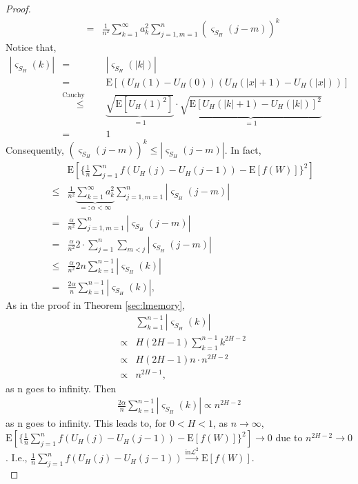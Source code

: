 \documentclass[a4paper, twoside, 11pt]{article}
\theoremstyle{definition}
\begin{document}
\begin{proof}
\begin{eqnarray*}
	&=& \frac{1}{n^2} \sum\limits_{k=1}^\infty a_k^2\sum\limits_{j=1, m=1}^n (\varsigma_{S_H}(j-m))^k
  \end{eqnarray*}
	Notice that,
	\begin{eqnarray*}
	  |\varsigma_{S_H}(k)| &=& |\varsigma_{S_H}(|k|)|\\
	  &=& \mathrm{E}[(U_H(1) - U_H(0))(U_H(|x|+1)-U_H(|x|))]\\
	  &\overset{\text{Cauchy Schwartz}}{\le}& \underbrace{\sqrt{\mathrm{E}[U_H(1)^2]}}_{= 1}\cdot \underbrace{\sqrt{\mathrm{E}[U_H(|k|+1) - U_H(|k|)]^2}}_{= 1}\\
	  &=& 1
	\end{eqnarray*}
	Consequently, $(\varsigma_{S_H}(j-m))^k \le |\varsigma_{S_H}(j-m)|$. In fact,
	\begin{eqnarray*}
	  && \mathrm{E}[\{\frac{1}{n}\sum\limits_{j=1}^n f(U_H(j) - U_H(j-1)) - \mathrm{E}[f(W)]\}^2]\\
	  &\le& \frac{1}{n^2} \underbrace{\sum\limits_{k=1}^\infty a_k^2}_{=:\alpha < \infty}\sum\limits_{j=1, m=1}^n |\varsigma_{S_H}(j-m)|\\
	  &=& \frac{\alpha}{n^2} \sum\limits_{j=1, m=1}^n |\varsigma_{S_H}(j-m)|\\
	  &=& \frac{\alpha}{n^2} 2 \cdot \sum\limits_{j=1}^n  \sum\limits_{m<j} |\varsigma_{S_H}(j-m)|\\
	  &\le& \frac{\alpha}{n^2} 2n \sum\limits_{k=1}^{n-1} |\varsigma_{S_H}(k)|\\
	  &=& \frac{2\alpha}{n}  \sum\limits_{k=1}^{n-1} |\varsigma_{S_H}(k)|,
	\end{eqnarray*}
	As in the proof in Theorem \ref{sec:lmemory}, 
	\begin{eqnarray*}
	&&\sum\limits_{k=1}^{n-1} |\varsigma_{S_H}(k)| \\
	&\propto& H(2H-1)\sum\limits_{k=1}^{n-1}k^{2H-2} \\
	&\propto& H(2H-1)n\cdot n^{2H-2} \\
	&\propto& n^{2H-1}, 
  \end{eqnarray*}
  as n goes to infinity. Then
	\begin{eqnarray*}
	  \frac{2\alpha}{n} \sum\limits_{k=1}^{n-1} |\varsigma_{S_H}(k)| \propto n^{2H-2}
	\end{eqnarray*}
	as n goes to infinity. This leads to,  for $0<H<1$, as $n \rightarrow \infty$,  $\mathrm{E}[\{\frac{1}{n}\sum\limits_{j=1}^n f(U_H(j) - U_H(j-1)) - \mathrm{E}[f(W)]\}^2]\rightarrow 0$ due to $n^{2H-2}\rightarrow 0$. I.e., $\frac{1}{n}\sum\limits_{j=1}^n f(U_H(j) - U_H(j-1)) \overset{\text{in} \mathcal{L}^2}{\rightarrow} \mathrm{E}[f(W)]$.\\


\end{proof}
\end{document}
